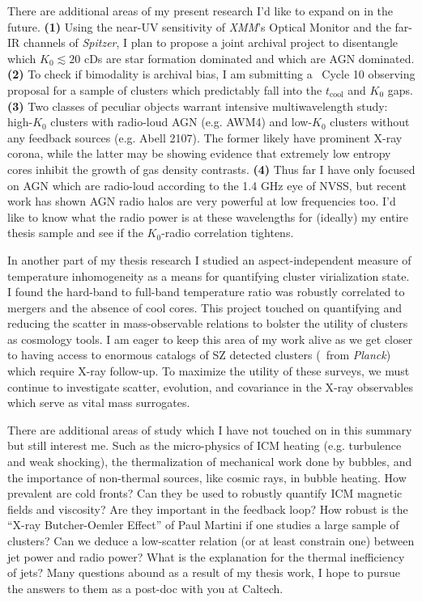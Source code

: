 \documentclass[11pt]{article}
\begin{document}
There are additional areas of my present research I'd like to expand
on in the future. {\bf(1)} Using the near-UV sensitivity of
{\it XMM}'s Optical Monitor and the far-IR channels of {\it Spitzer},
I plan to propose a joint archival project to disentangle which $K_0
\lesssim 20$ cDs are star formation dominated and which are AGN
dominated. {\bf(2)} To check if bimodality is archival bias, I am
submitting a \Chandra\ Cycle 10 observing proposal for a sample of
clusters which predictably fall into the $t_{\mathrm{cool}}$ and $K_0$
gaps. {\bf(3)} Two classes of peculiar objects warrant intensive
multiwavelength study: high-$K_0$ clusters with radio-loud AGN
(e.g. AWM4) and low-$K_0$ clusters without any feedback sources
(e.g. Abell 2107). The former likely have prominent X-ray corona,
while the latter may be showing evidence that extremely low entropy
cores inhibit the growth of gas density contrasts. {\bf(4)} Thus far I have
only focused on AGN which are radio-loud according to the 1.4 GHz eye
of NVSS, but recent work has shown AGN radio halos are very powerful
at low frequencies too. I'd like to know what the radio power is at
these wavelengths for (ideally) my entire thesis sample and see if the
$K_0$-radio correlation tightens. 

In another part of my thesis research I studied an aspect-independent
measure of temperature inhomogeneity as a means for quantifying
cluster virialization state. I found the hard-band to full-band
temperature ratio was robustly correlated to mergers and the absence
of cool cores. This project touched on quantifying and reducing the
scatter in mass-observable relations to bolster the utility of
clusters as cosmology tools. I am eager to keep this area of my work
alive as we get closer to having access to enormous catalogs of SZ
detected clusters (\eg\ from {\it Planck}) which require X-ray follow-up. To
maximize the utility of these surveys, we must continue to investigate
scatter, evolution, and covariance in the X-ray observables which
serve as vital mass surrogates.

There are additional areas of study which I have not touched on in this
summary but still interest me. Such as the micro-physics of ICM
heating (e.g. turbulence and weak shocking), the thermalization of
mechanical work done by bubbles, and the importance of non-thermal
sources, like cosmic rays, in bubble heating. How prevalent are cold
fronts? Can they be used to robustly quantify ICM magnetic fields and
viscosity? Are they important in the feedback loop? How robust is the
``X-ray Butcher-Oemler Effect'' of Paul Martini if one studies a large
sample of clusters? Can we deduce a low-scatter relation (or at least
constrain one) between jet power and radio power? What is the
explanation for the thermal inefficiency of jets? Many questions
abound as a result of my thesis work, I hope to pursue the answers to
them as a post-doc with you at Caltech.
\end{document}
